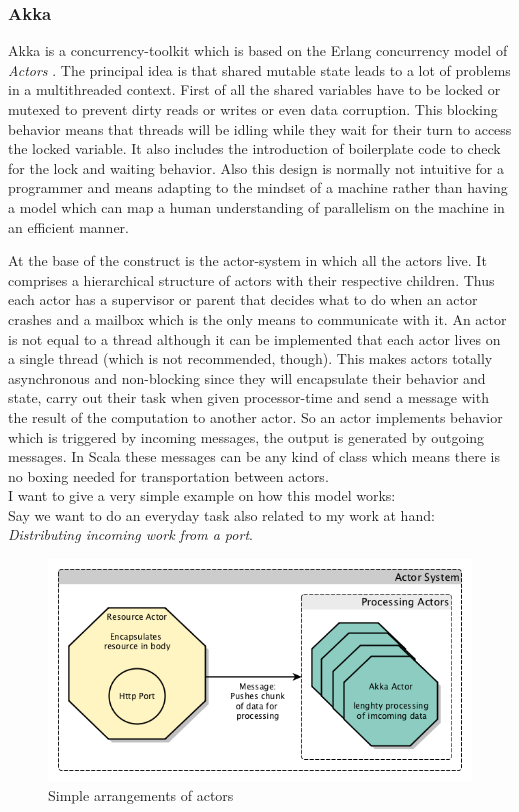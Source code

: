 \documentclass[twoside, 11pt]{scrartcl}
\begin{document}
\subsubsection{Akka}
\label{sec:akka}
Akka \citep{link:akkaHome} is a concurrency-toolkit which is based on the Erlang concurrency model of \textit{Actors} \cite{link:erlangConcurrency}.
The principal idea is that shared mutable state leads to a lot of problems in a multithreaded context. First of all the shared variables have to be locked or mutexed to prevent dirty reads or writes or even data corruption. This blocking behavior means that threads will be idling while they wait for their turn to access the locked variable. It also includes the introduction of boilerplate code to check for the lock and waiting behavior. Also this design is normally not intuitive for a programmer and means adapting to the mindset of a machine rather than having a model which can map a human understanding of parallelism on the machine in an efficient manner.

At the base of the construct is the actor-system in which all the actors live. It comprises a hierarchical structure of actors with their respective children. Thus each actor has a supervisor or parent that decides what to do when an actor crashes and a mailbox which is the only means to communicate with it. An actor is not equal to a thread although it can be implemented that each actor lives on a single thread (which is not recommended, though).
This makes actors totally asynchronous and non-blocking since they will encapsulate their behavior and state, carry out their task when given processor-time and send a message with the result of the computation to another actor. So an actor implements behavior which is triggered by incoming messages, the output is generated by outgoing messages. In Scala these messages can be any kind of class which means there is no boxing needed for transportation between actors.\\

I want to give a very simple example on how this model works:\\
Say we want to do an everyday task also related to my work at hand: \textit{Distributing incoming work from a port}.

\begin{figure}[h]		
 	\includegraphics[scale=0.4]{figures/akkaExample1.png}
	\caption{Simple arrangements of actors}
	\label{fig:akkaExample1}
\end{figure}
\end{document}
